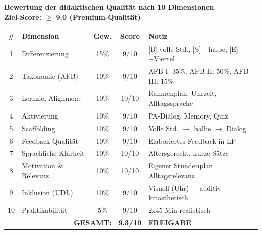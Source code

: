 \documentclass[11pt,a4paper]{article}
\begin{document}
\begin{scorebox}
\textbf{Bewertung der didaktischen Qualität nach 10 Dimensionen}\\
\textbf{Ziel-Score: $\geq$ 9.0 (Premium-Qualität)}

\vspace{1em}
\begin{tabular}{|c|l|c|c|p{4.5cm}|}
\hline
\textbf{\#} & \textbf{Dimension} & \textbf{Gew.} & \textbf{Score} & \textbf{Notiz} \\
\hline
1 & Differenzierung & 15\% & 9/10 & [B] volle Std., [S] +halbe, [E] +Viertel \\
\hline
2 & Taxonomie (AFB) & 10\% & 9/10 & AFB I: 35\%, AFB II: 50\%, AFB III: 15\% \\
\hline
3 & Lernziel-Alignment & 10\% & 10/10 & Rahmenplan: Uhrzeit, Alltagssprache \\
\hline
4 & Aktivierung & 10\% & 9/10 & PA-Dialog, Memory, Quiz \\
\hline
5 & Scaffolding & 10\% & 9/10 & Volle Std. $\rightarrow$ halbe $\rightarrow$ Dialog \\
\hline
6 & Feedback-Qualität & 10\% & 9/10 & Elaboriertes Feedback in LP \\
\hline
7 & Sprachliche Klarheit & 10\% & 10/10 & Altersgerecht, kurze Sätze \\
\hline
8 & Motivation \& Relevanz & 10\% & 10/10 & Eigener Stundenplan = Alltagsrelevanz \\
\hline
9 & Inklusion (UDL) & 10\% & 9/10 & Visuell (Uhr) + auditiv + kinästhetisch \\
\hline
10 & Praktikabilität & 5\% & 9/10 & 2x45 Min realistisch \\
\hline
\multicolumn{3}{|r|}{\textbf{GESAMT:}} & \textbf{9.3/10} & \textcolor{successgreen}{\textbf{FREIGABE}} \\
\hline
\end{tabular}
\end{scorebox}
\end{document}
